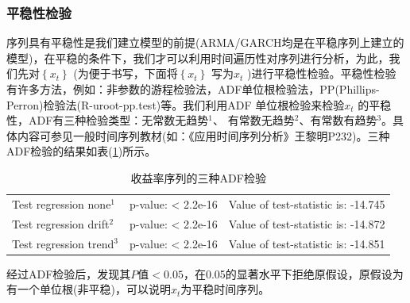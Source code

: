         \subsubsection{平稳性检验}
            \par
            序列具有平稳性是我们建立模型的前提(ARMA/GARCH均是在平稳序列上建立的模型)，在平稳的条件下，我们才可以利用时间遍历性对序列进行分析，为此，我们先对$\left\{x_t\right\}$ (为便于书写，下面将$\left\{x_t\right\}$ 写为$x_t$ )进行平稳性检验。平稳性检验有许多方法，例如：非参数的游程检验法，ADF单位根检验法，PP(Phillips-Perron)检验法(R-uroot-pp.test)等。我们利用ADF 单位根检验来检验$x_t$ 的平稳性，ADF有三种检验类型：无常数无趋势$^1$、
            有常数无趋势$^2$、有常数有趋势$^3$。具体内容可参见一般时间序列教材(如：《应用时间序列分析》王黎明P232)。三种ADF检验的结果如表(\ref{收益率序列的三种ADF检验})所示。
        \begin{table}[H]
        \centering
        \caption{收益率序列的三种ADF检验}
        \label{收益率序列的三种ADF检验}
        \begin{tabular}{lll}
            \toprule
    Test regression none$^1$   & p-value: < 2.2e-16  & Value of test-statistic is: -14.745\\
    Test regression drift$^2$  & p-value: < 2.2e-16  & Value of test-statistic is: -14.872\\
    Test regression trend$^3$  & p-value: < 2.2e-16  & Value of test-statistic is: -14.851\\
        \bottomrule
        \end{tabular}
        \end{table}
            \par
            经过ADF检验后，发现其$P$值$<0.05$，在0.05的显著水平下拒绝原假设，原假设为有一个单位根(非平稳)，可以说明$x_t$为平稳时间序列。
